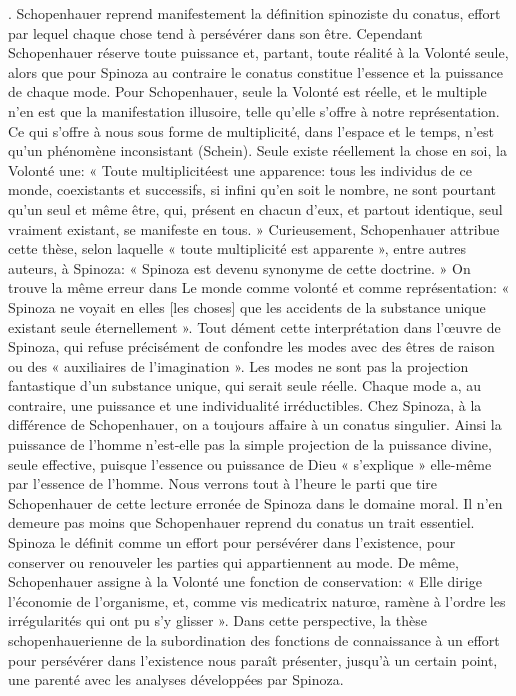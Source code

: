 . Schopenhauer reprend manifestement la définition spinoziste du conatus, effort par lequel chaque
chose tend à persévérer dans son être.
Cependant Schopenhauer réserve toute puissance et, partant, toute réalité à la Volonté seule, alors que pour
Spinoza au contraire le conatus constitue l’essence et la puissance de chaque mode. Pour Schopenhauer,
seule la Volonté est réelle, et le multiple n’en est que la manifestation illusoire, telle qu’elle s’offre à notre
représentation. Ce qui s’offre à nous sous forme de multiplicité, dans l’espace et le temps, n’est qu’un
phénomène inconsistant (Schein). Seule existe réellement la chose en soi, la Volonté une: « Toute multiplicitéest une apparence: tous les individus de ce monde, coexistants et successifs, si infini qu’en soit le nombre, ne
sont pourtant qu’un seul et même être, qui, présent en chacun d’eux, et partout identique, seul vraiment
existant, se manifeste en tous. » Curieusement, Schopenhauer attribue cette thèse, selon laquelle « toute
multiplicité est apparente », entre autres auteurs, à Spinoza: « Spinoza est devenu synonyme de cette
doctrine. » On trouve la même erreur dans Le monde comme volonté et comme représentation: « Spinoza
ne voyait en elles [les choses] que les accidents de la substance unique existant seule éternellement ».
Tout dément cette interprétation dans l’œuvre de Spinoza, qui refuse précisément de confondre les modes
avec des êtres de raison ou des « auxiliaires de l’imagination ». Les modes ne sont pas la projection
fantastique d’un substance unique, qui serait seule réelle. Chaque mode a, au contraire, une puissance et une
individualité irréductibles. Chez Spinoza, à la différence de Schopenhauer, on a toujours affaire à un conatus
singulier. Ainsi la puissance de l’homme n’est-elle pas la simple projection de la puissance divine, seule
effective, puisque l’essence ou puissance de Dieu « s’explique » elle-même par l’essence de l’homme.
Nous verrons tout à l’heure le parti que tire Schopenhauer de cette lecture erronée
de Spinoza dans le domaine moral.
Il n’en demeure pas moins que Schopenhauer reprend du conatus un trait essentiel. Spinoza le définit
comme un effort pour persévérer dans l’existence, pour conserver ou renouveler les parties qui appartiennent
au mode. De même, Schopenhauer assigne à la Volonté une fonction de conservation:
« Elle dirige l’économie de l’organisme, et, comme vis medicatrix naturœ, ramène à l’ordre les irrégularités
qui ont pu s’y glisser ». Dans cette perspective, la thèse schopenhauerienne de la
subordination des fonctions de connaissance à un effort pour persévérer dans l’existence nous paraît
présenter, jusqu’à un certain point, une parenté avec les analyses développées par Spinoza.

